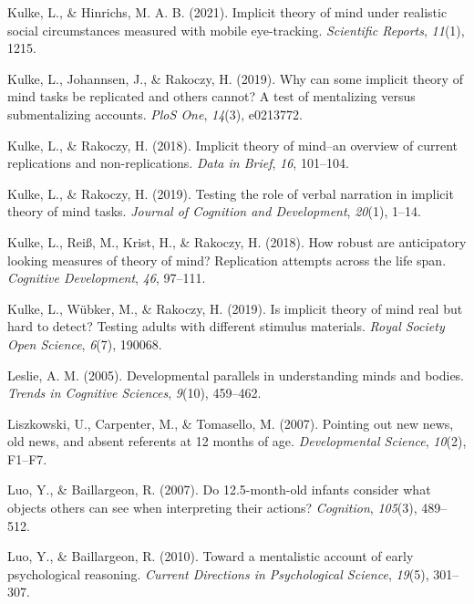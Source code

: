 \documentclass[
  english,
  man,floatsintext]{apa6}
\newlength{\cslhangindent}
\newlength{\cslentryspacingunit} %
\newenvironment{CSLReferences}[2] %
 {%
  \setlength{\parindent}{0pt}
  \ifodd #1
  \let\oldpar\par
  \def\par{\hangindent=\cslhangindent\oldpar}
  \fi
  \setlength{\parskip}{#2\cslentryspacingunit}
 }%
 {}
\begin{document}
\begin{CSLReferences}{1}{0}
\leavevmode{}%
Kulke, L., \& Hinrichs, M. A. B. (2021). Implicit theory of mind under realistic social circumstances measured with mobile eye-tracking. \emph{Scientific Reports}, \emph{11}(1), 1215.

\leavevmode{}%
Kulke, L., Johannsen, J., \& Rakoczy, H. (2019). Why can some implicit theory of mind tasks be replicated and others cannot? A test of mentalizing versus submentalizing accounts. \emph{PloS One}, \emph{14}(3), e0213772.

\leavevmode{}%
Kulke, L., \& Rakoczy, H. (2018). Implicit theory of mind--an overview of current replications and non-replications. \emph{Data in Brief}, \emph{16}, 101--104.

\leavevmode{}%
Kulke, L., \& Rakoczy, H. (2019). Testing the role of verbal narration in implicit theory of mind tasks. \emph{Journal of Cognition and Development}, \emph{20}(1), 1--14.

\leavevmode{}%
Kulke, L., Reiß, M., Krist, H., \& Rakoczy, H. (2018). How robust are anticipatory looking measures of theory of mind? Replication attempts across the life span. \emph{Cognitive Development}, \emph{46}, 97--111.

\leavevmode{}%
Kulke, L., Wübker, M., \& Rakoczy, H. (2019). Is implicit theory of mind real but hard to detect? Testing adults with different stimulus materials. \emph{Royal Society Open Science}, \emph{6}(7), 190068.

\leavevmode{}%
Leslie, A. M. (2005). Developmental parallels in understanding minds and bodies. \emph{Trends in Cognitive Sciences}, \emph{9}(10), 459--462.

\leavevmode{}%
Liszkowski, U., Carpenter, M., \& Tomasello, M. (2007). Pointing out new news, old news, and absent referents at 12 months of age. \emph{Developmental Science}, \emph{10}(2), F1--F7.

\leavevmode{}%
Luo, Y., \& Baillargeon, R. (2007). Do 12.5-month-old infants consider what objects others can see when interpreting their actions? \emph{Cognition}, \emph{105}(3), 489--512.

\leavevmode{}%
Luo, Y., \& Baillargeon, R. (2010). Toward a mentalistic account of early psychological reasoning. \emph{Current Directions in Psychological Science}, \emph{19}(5), 301--307.


\end{CSLReferences}
\end{document}
